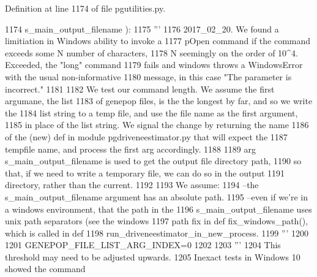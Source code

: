 Definition at line 1174 of file pgutilities.\+py.


\begin{DoxyCode}
1174                                                                 s\_main\_output\_filename ):
1175     \textcolor{stringliteral}{'''}
1176 \textcolor{stringliteral}{    2017\_02\_20.  We found a limitiation in Windows ability to invoke a }
1177 \textcolor{stringliteral}{    pOpen command if the command exceeds some N number of characters,}
1178 \textcolor{stringliteral}{    N seemingly on the order of 10^4.  Exceeded, the "long" command }
1179 \textcolor{stringliteral}{    fails and windows throws a WindowsError with the usual non-informative}
1180 \textcolor{stringliteral}{    message, in this case "The parameter is incorrect."}
1181 \textcolor{stringliteral}{}
1182 \textcolor{stringliteral}{    We test our command length.  We assume the first argumane, the list}
1183 \textcolor{stringliteral}{    of genepop files, is the the longest by far, and so we write the}
1184 \textcolor{stringliteral}{    list string to a temp file, and use the file name as the first argument,}
1185 \textcolor{stringliteral}{    in place of the list string.  We signal the change by returning the name}
1186 \textcolor{stringliteral}{    of the (new) def in module pgdriveneestimator.py that will expect the}
1187 \textcolor{stringliteral}{    tempfile name, and process the first arg accordingly.}
1188 \textcolor{stringliteral}{}
1189 \textcolor{stringliteral}{    arg s\_main\_output\_filename is used to get the output file directory path,}
1190 \textcolor{stringliteral}{    so that, if we need to write a temporary file, we can do so in the output}
1191 \textcolor{stringliteral}{    directory, rather than the current.}
1192 \textcolor{stringliteral}{}
1193 \textcolor{stringliteral}{    We assume:}
1194 \textcolor{stringliteral}{        --the s\_main\_output\_filename argument has an absolute path. }
1195 \textcolor{stringliteral}{        --even if we're in a windows environment, that the path in the }
1196 \textcolor{stringliteral}{        s\_main\_output\_filename uses unix path separators (see the windows }
1197 \textcolor{stringliteral}{        path fix in def fix\_windows\_path(), which is called in def }
1198 \textcolor{stringliteral}{        run\_driveneestimator\_in\_new\_process.}
1199 \textcolor{stringliteral}{    '''}
1200 
1201     GENEPOP\_FILE\_LIST\_ARG\_INDEX=0
1202     
1203     \textcolor{stringliteral}{'''}
1204 \textcolor{stringliteral}{    This threshold may need to be adjusted upwards.}
1205 \textcolor{stringliteral}{    Inexact tests in Windows 10 showed the command }

\end{DoxyCode}
